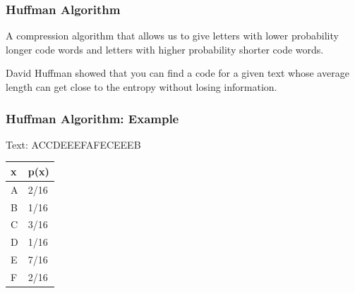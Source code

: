 \documentclass{beamer}
\theoremstyle{definition}
\begin{document}
\begin{frame}

\frametitle{Huffman Algorithm}
\begin{definition}
A compression algorithm that allows us to give letters with lower probability longer code words and letters with higher probability shorter code words.
\end{definition}

David Huffman showed that you can find a code for a given text whose average length can get close to the entropy without losing information.

\end{frame}


\begin{frame}

\frametitle{Huffman Algorithm: Example}

\center
Text: ACCDEEEFAFECEEEB

\pause

\begin{center}
\begin{tabular}{ | l | l | }
\hline
x & p(x) \\ \hline
A & 2/16 \\ \hline
B & 1/16 \\ \hline
C & 3/16 \\ \hline
D & 1/16 \\ \hline
E & 7/16 \\ \hline
F & 2/16 \\
\hline
\end{tabular}
\end{center}

\end{frame}
\end{document}
